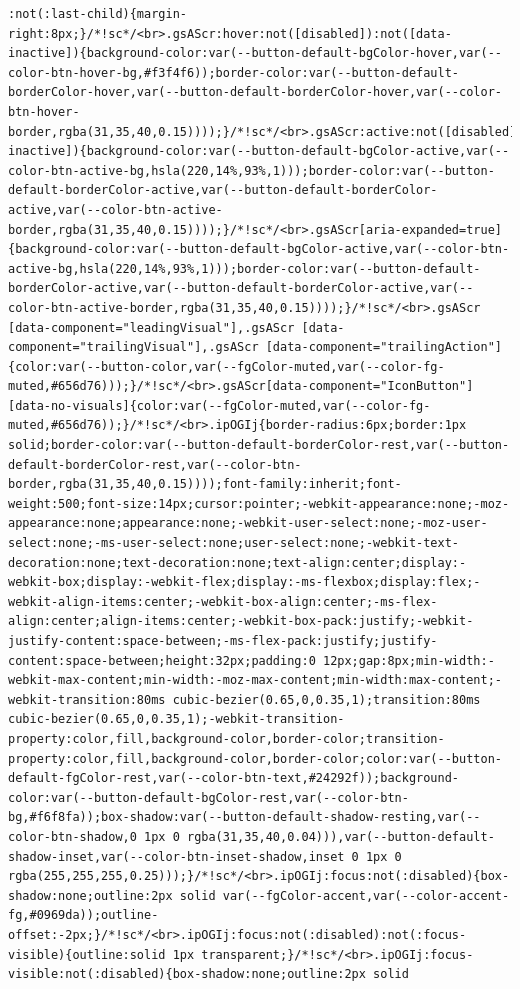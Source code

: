 \documentclass[
  letterpaper,
]{book}
\begin{document}
\begin{verbatim}
:not(:last-child){margin-right:8px;}/*!sc*/<br>.gsAScr:hover:not([disabled]):not([data-inactive]){background-color:var(--button-default-bgColor-hover,var(--color-btn-hover-bg,#f3f4f6));border-color:var(--button-default-borderColor-hover,var(--button-default-borderColor-hover,var(--color-btn-hover-border,rgba(31,35,40,0.15))));}/*!sc*/<br>.gsAScr:active:not([disabled]):not([data-inactive]){background-color:var(--button-default-bgColor-active,var(--color-btn-active-bg,hsla(220,14%,93%,1)));border-color:var(--button-default-borderColor-active,var(--button-default-borderColor-active,var(--color-btn-active-border,rgba(31,35,40,0.15))));}/*!sc*/<br>.gsAScr[aria-expanded=true]{background-color:var(--button-default-bgColor-active,var(--color-btn-active-bg,hsla(220,14%,93%,1)));border-color:var(--button-default-borderColor-active,var(--button-default-borderColor-active,var(--color-btn-active-border,rgba(31,35,40,0.15))));}/*!sc*/<br>.gsAScr [data-component="leadingVisual"],.gsAScr [data-component="trailingVisual"],.gsAScr [data-component="trailingAction"]{color:var(--button-color,var(--fgColor-muted,var(--color-fg-muted,#656d76)));}/*!sc*/<br>.gsAScr[data-component="IconButton"][data-no-visuals]{color:var(--fgColor-muted,var(--color-fg-muted,#656d76));}/*!sc*/<br>.ipOGIj{border-radius:6px;border:1px solid;border-color:var(--button-default-borderColor-rest,var(--button-default-borderColor-rest,var(--color-btn-border,rgba(31,35,40,0.15))));font-family:inherit;font-weight:500;font-size:14px;cursor:pointer;-webkit-appearance:none;-moz-appearance:none;appearance:none;-webkit-user-select:none;-moz-user-select:none;-ms-user-select:none;user-select:none;-webkit-text-decoration:none;text-decoration:none;text-align:center;display:-webkit-box;display:-webkit-flex;display:-ms-flexbox;display:flex;-webkit-align-items:center;-webkit-box-align:center;-ms-flex-align:center;align-items:center;-webkit-box-pack:justify;-webkit-justify-content:space-between;-ms-flex-pack:justify;justify-content:space-between;height:32px;padding:0 12px;gap:8px;min-width:-webkit-max-content;min-width:-moz-max-content;min-width:max-content;-webkit-transition:80ms cubic-bezier(0.65,0,0.35,1);transition:80ms cubic-bezier(0.65,0,0.35,1);-webkit-transition-property:color,fill,background-color,border-color;transition-property:color,fill,background-color,border-color;color:var(--button-default-fgColor-rest,var(--color-btn-text,#24292f));background-color:var(--button-default-bgColor-rest,var(--color-btn-bg,#f6f8fa));box-shadow:var(--button-default-shadow-resting,var(--color-btn-shadow,0 1px 0 rgba(31,35,40,0.04))),var(--button-default-shadow-inset,var(--color-btn-inset-shadow,inset 0 1px 0 rgba(255,255,255,0.25)));}/*!sc*/<br>.ipOGIj:focus:not(:disabled){box-shadow:none;outline:2px solid var(--fgColor-accent,var(--color-accent-fg,#0969da));outline-offset:-2px;}/*!sc*/<br>.ipOGIj:focus:not(:disabled):not(:focus-visible){outline:solid 1px transparent;}/*!sc*/<br>.ipOGIj:focus-visible:not(:disabled){box-shadow:none;outline:2px solid 
\end{verbatim}
\end{document}
